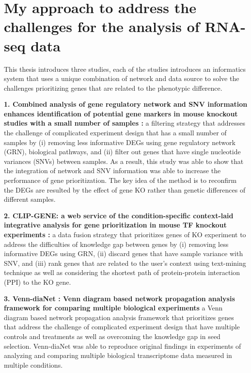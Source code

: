 \documentclass[oneside,phd]{snuthesis}
\begin{document}
\section{My approach to address the challenges for the  analysis of  RNA-seq data}

This thesis introduces three studies, each of the studies introduces an informatics system that uses a unique combination of network and data source to solve the challenges prioritizing genes that are related to the phenotypic difference.

\noindent \textbf{1. Combined analysis of gene regulatory network and SNV information enhances identification of potential gene markers in mouse knockout studies with a small number of samples :} a filtering strategy that addresses the challenge of complicated experiment design that has a small number of samples by
(i) removing less informative DEGs using gene regulatory network (GRN), biological pathways, and (ii) filter out genes that have single nucleotide variances (SNVs) between samples.
As a result, this study was able to show that the integration of network and SNV information was able to increase the performance of gene prioritization. The key idea of the method is to reconfirm the DEGs are resulted by the effect of gene KO rather than genetic differences of different samples.

\noindent \textbf{2. CLIP-GENE: a web service of the condition-specific context-laid integrative analysis for gene prioritization in mouse TF knockout experiments :} a data fusion strategy that prioritizes genes of KO experiment to address the difficulties of knowledge gap between genes by (i) removing less informative DEGs using GRN, (ii) discard genes that have sample variance with SNV, and (iii) rank genes that are related to the user's context using text-mining technique as well as considering the shortest path of protein-protein interaction (PPI) to the KO gene.

\noindent \textbf{3. Venn-diaNet : Venn diagram based network propagation analysis framework for comparing multiple biological experiments} a Venn diagram based network propagation analysis framework that prioritizes genes that address the challenge of complicated experiment design that have multiple controls and treatments as well as overcoming the knowledge gap in seed selection.
Venn-diaNet was able to reproduce original findings in experiments of analyzing and comparing multiple biological transcriptome data measured in multiple conditions. 
\end{document}
